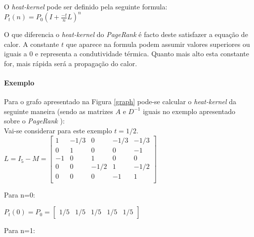 \documentclass[a4paper,10pt]{report}
\begin{document}
    O \textit{heat-kernel} pode ser definido pela seguinte formula:\\
    $P_t(n)=P_0(I+\frac{-t}{n}L)^n$
    
  O que diferencia o \textit{heat-kernel} do \textit{PageRank} é  facto deste satisfazer a equação de calor. A constante $t$ que aparece na formula podem assumir valores superiores ou iguais a 0 e representa a condutividade térmica. Quanto mais alto esta constante for, mais rápida será a propagação do calor.  
    
  \paragraph{Exemplo}   
  Para o grafo apresentado na Figura \ref{graph} pode-se calcular o \textit{heat-kernel} da seguinte maneira (sendo as matrizes $A$ e $D^{{-}1}$ iguais no exemplo apresentado sobre o \textit{PageRank} ): \\[0.25cm]
  Vai-se considerar para este exemplo $t=1/2$. \\[0.25cm]
  $L = I_5 - M = \begin{bmatrix} 
		    1 & -1/3 & 0 & -1/3 & -1/3 \\
		    0 & 1 & 0 & 0 & -1 \\
		    -1 & 0 & 1 & 0 & 0\\
		    0 & 0 & -1/2 & 1 & -1/2\\
		    0 & 0 & 0 & -1 & 1\\
		 \end{bmatrix}$
  \\[0.25cm]
  \begin{bf}
    Para n=0:
  \end{bf}
  
  $P_t(0) = P_0 = \begin{bmatrix} 1/5 & 1/5 & 1/5 & 1/5 & 1/5 \end{bmatrix}$
  \\[0.25cm]
  \begin{bf}
    Para n=1:
  \end{bf}
  
\end{document}
